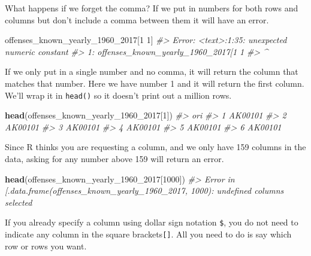 \documentclass[
  12pt,
]{book}
\newenvironment{Shaded}{\begin{snugshade}}{\end{snugshade}}
\newcommand{\CommentTok}[1]{\textcolor[rgb]{0.37,0.37,0.37}{\textit{#1}}}
\newcommand{\DecValTok}[1]{\textcolor[rgb]{0.06,0.06,0.06}{#1}}
\newcommand{\KeywordTok}[1]{\textcolor[rgb]{0.27,0.27,0.27}{\textbf{#1}}}
\newcommand{\NormalTok}[1]{#1}
\begin{document}
What happens if we forget the comma? If we put in numbers for both rows and columns but don't include a comma between them it will have an error.

\begin{Shaded}
\begin{Highlighting}[]
\NormalTok{offenses\_known\_yearly\_}\DecValTok{1960}\NormalTok{\_}\DecValTok{2017}\NormalTok{[}\DecValTok{1} \DecValTok{1}\NormalTok{]}
\CommentTok{\#> Error: <text>:1:35: unexpected numeric constant}
\CommentTok{\#> 1: offenses\_known\_yearly\_1960\_2017[1 1}
\CommentTok{\#>                                       \^{}}
\end{Highlighting}
\end{Shaded}

If we only put in a single number and no comma, it will return the column that matches that number. Here we have number 1 and it will return the first column. We'll wrap it in \texttt{head()} so it doesn't print out a million rows.

\begin{Shaded}
\begin{Highlighting}[]
\KeywordTok{head}\NormalTok{(offenses\_known\_yearly\_}\DecValTok{1960}\NormalTok{\_}\DecValTok{2017}\NormalTok{[}\DecValTok{1}\NormalTok{])}
\CommentTok{\#>       ori}
\CommentTok{\#> 1 AK00101}
\CommentTok{\#> 2 AK00101}
\CommentTok{\#> 3 AK00101}
\CommentTok{\#> 4 AK00101}
\CommentTok{\#> 5 AK00101}
\CommentTok{\#> 6 AK00101}
\end{Highlighting}
\end{Shaded}

Since R thinks you are requesting a column, and we only have 159 columns in the data, asking for any number above 159 will return an error.

\begin{Shaded}
\begin{Highlighting}[]
\KeywordTok{head}\NormalTok{(offenses\_known\_yearly\_}\DecValTok{1960}\NormalTok{\_}\DecValTok{2017}\NormalTok{[}\DecValTok{1000}\NormalTok{])}
\CommentTok{\#> Error in \textasciigrave{}[.data.frame\textasciigrave{}(offenses\_known\_yearly\_1960\_2017, 1000): undefined columns selected}
\end{Highlighting}
\end{Shaded}

If you already specify a column using dollar sign notation \texttt{\$}, you do not need to indicate any column in the square brackets\texttt{{[}{]}}. All you need to do is say which row or rows you want.
\end{document}
